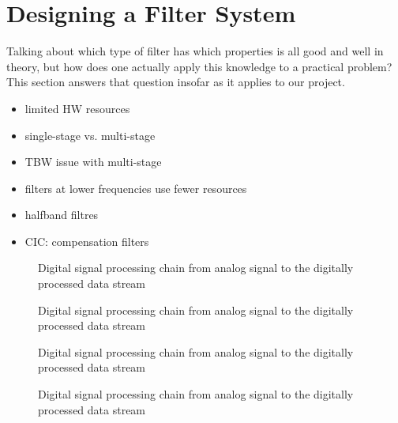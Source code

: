 \documentclass[a4paper,oneside]{alpenthesis/alpenthesis}
\begin{document}
\section{Designing a Filter System}
\label{sec:designing-a-filter-system}

Talking about which type of filter has which properties is all good and well in theory, but
how does one actually apply this knowledge to a practical problem? This section answers that
question insofar as it applies to our project.

\begin{itemize}\tightlist
    \item
        limited HW resources
    \item
        single-stage vs. multi-stage
    \item
        TBW issue with multi-stage
    \item
        filters at lower frequencies use fewer resources
    \item
        halfband filtres
    \item
        CIC: compensation filters
\end{itemize}

\begin{figure}
    \centering
    
    \caption{Digital signal processing chain from analog signal to the digitally processed data stream}
    \label{fig:dspChain:blocks}
\end{figure}

\begin{figure}
    \centering
    
    \caption{Digital signal processing chain from analog signal to the digitally processed data stream}
    \label{fig:dspChain:timedomain}
\end{figure}

\begin{figure}
    \centering
    
    \caption{Digital signal processing chain from analog signal to the digitally processed data stream}
    \label{fig:dspChain:freqDomain}
\end{figure}

\begin{figure}
    \centering
    
    \caption{Digital signal processing chain from analog signal to the digitally processed data stream}
    \label{fig:aliasing:band}
\end{figure}
\end{document}
